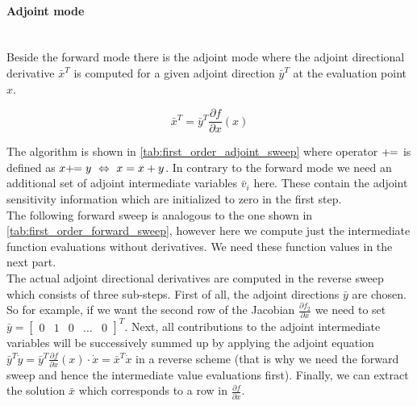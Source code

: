 \documentclass{scrartcl}[12pt, halfparskip]
\numberwithin{equation}{section}
\numberwithin{figure}{section}
\numberwithin{table}{section}
\begin{document}
\paragraph{Adjoint mode}\mbox{}\\
Beside the forward mode there is the adjoint mode where the adjoint directional derivative $\bar{x}^T$ is computed for a given adjoint direction $\bar{y}^T$ at the evaluation point $x$. 

\begin{equation}
\bar{x}^T = \bar{y}^T \frac{\partial f}{\partial x}(x)
\end{equation}

The algorithm is shown in \cref{tab:first_order_adjoint_sweep} where operator $+ \hspace{-0.12cm} =$ is defined as $x + \hspace{-0.12cm} = y \ \Leftrightarrow \ x = x + y$. In contrary to the forward mode we need an additional set of adjoint intermediate variables $\bar{v}_i$ here. These contain the adjoint sensitivity information which are initialized to zero in the first step. \\
The following forward sweep is analogous to the one shown in \cref{tab:first_order_forward_sweep}, however here we compute just the intermediate function evaluations without derivatives. We need these function values in the next part. \\
The actual adjoint directional derivatives are computed in the reverse sweep which consists of three sub-steps. First of all, the adjoint directions $\bar{y}$ are chosen. So for example, if we want the second row of the Jacobian $\frac{\partial f_2}{\partial x}$ we need to set $\bar{y} = \begin{bmatrix}
0 & 1 & 0 & \dots & 0
\end{bmatrix}^T$.
Next, all contributions to the adjoint intermediate variables will be successively summed up by applying the adjoint equation $\bar{y}^T \dot{y} = \bar{y}^T \frac{\partial f}{\partial x}(x) \cdot \dot{x} = \bar{x}^T \dot{x}$ in a reverse scheme (that is why we need the forward sweep and hence the intermediate value evaluations first). Finally, we can extract the solution $\bar{x}$ which corresponds to a row in $\frac{\partial f}{\partial x}$.
\end{document}
